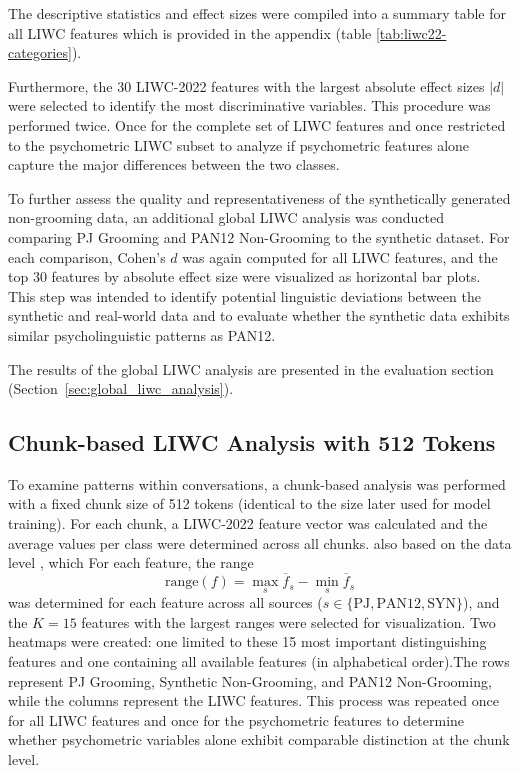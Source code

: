 The descriptive statistics and effect sizes were compiled into a summary table for all LIWC features which is provided in the appendix (table \ref{tab:liwc22-categories}).

Furthermore, the 30 LIWC-2022 features with the largest absolute effect sizes \(|d|\) were selected to identify the most discriminative variables. 
This procedure was performed twice. Once for the complete set of LIWC features and once restricted to the psychometric LIWC subset to analyze if psychometric features alone capture the major differences between the two classes. 

To further assess the quality and representativeness of the synthetically generated non-grooming data, an additional global LIWC analysis was conducted comparing PJ Grooming and PAN12 Non-Grooming to the synthetic dataset. 
For each comparison, Cohen’s \(d\) was again computed for all LIWC features, and the top 30 features by absolute effect size were visualized as horizontal bar plots. 
This step was intended to identify potential linguistic deviations between the synthetic and real-world data and to evaluate whether the synthetic data exhibits similar psycholinguistic patterns as PAN12.

The results of the global LIWC analysis are presented in the evaluation section (Section~\ref{sec:global_liwc_analysis}).

\subsection{Chunk-based LIWC Analysis with 512 Tokens}

To examine patterns within conversations, a chunk-based analysis was performed with a fixed chunk size of 512 tokens (identical to the size later used for model training). For each chunk, a LIWC-2022 feature vector was calculated and the average values per class were determined across all chunks. also based on the data level , which
For each feature, the range
\[
\mathrm{range}(f) = \max_{s}\overline{f}_{s} - \min_{s}\overline{f}_ {s}
\]
was determined for each feature across all sources (\(s \in \{\mathrm{PJ}, \mathrm{PAN12}, \mathrm{SYN}\}\)), and the \(K=15\) features with the largest ranges were selected for visualization.
Two heatmaps were created: one limited to these 15 most important distinguishing features and one containing all available features (in alphabetical order).The rows represent PJ Grooming, Synthetic Non-Grooming, and PAN12 Non-Grooming, while the columns represent the LIWC features.
This process was repeated once for all LIWC features and once for the psychometric features to determine whether psychometric variables alone exhibit comparable distinction at the chunk level.

